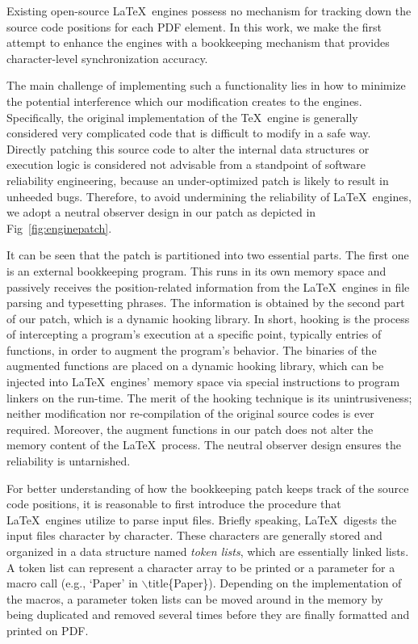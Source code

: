 \documentclass[sigconf]{acmart}
\begin{document}
Existing open-source \LaTeX\ engines possess no mechanism for tracking down the source code positions for each PDF element. 
In this work, we make the first attempt to enhance the engines with a bookkeeping mechanism that provides character-level synchronization accuracy.

The main challenge of implementing such a functionality lies in how to minimize the potential interference which our modification creates to the engines. 
Specifically, the original implementation of the \TeX\ engine is generally considered very complicated code that is difficult to modify in a safe way.  
Directly patching this source code  to alter the internal data structures or execution logic is considered not advisable from a standpoint of software reliability engineering, because an under-optimized patch is likely to result in unheeded bugs.
Therefore, to avoid undermining the reliability of \LaTeX\ engines, we adopt a neutral observer design in our patch as depicted in Fig~\ref{fig:enginepatch}.

It can be seen that the patch is partitioned into two essential parts. The first one is an external bookkeeping program. 
This runs in its own memory space and passively receives the position-related information from the \LaTeX\ engines in file parsing and typesetting phrases.
The information is obtained by the second part of our patch, which is a dynamic hooking library. 
In short, hooking is the process of intercepting a program's execution at a specific point, typically entries of functions, in order to augment the program's behavior. 
The binaries of the augmented functions are placed on a dynamic hooking library, which can be injected into \LaTeX\ engines' memory space via special instructions to program linkers on the run-time. 
The merit of the hooking technique is its unintrusiveness; neither modification nor re-compilation of the original source codes is ever required. 
Moreover, the augment functions in our patch does not alter the memory content of the \LaTeX\ process. The neutral observer design ensures the reliability is untarnished.

For better understanding of how the bookkeeping patch keeps track of the source code positions, it is reasonable to first introduce the procedure that \LaTeX\ engines utilize to parse input files. Briefly speaking, \LaTeX\ digests the input files character by character. 
These characters are generally stored and organized in a data structure named \textit{token lists}, which are essentially linked lists. 
A token list can represent a character array to be printed or a parameter for a macro call (e.g., `Paper' in $\backslash$title\{Paper\}). 
Depending on the implementation of the macros, a parameter token lists can be moved around in the memory by being duplicated and removed several times before they are finally formatted and printed on PDF.
\end{document}
